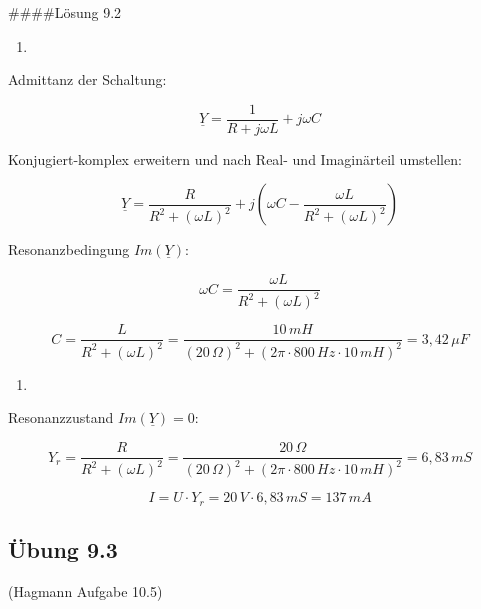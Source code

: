 \documentclass[
  ngerman,
  letterpaper,
]{scrbook}
\providecommand{\tightlist}{%
  \setlength{\itemsep}{0pt}\setlength{\parskip}{0pt}}
\begin{document}
\begin{tcolorbox}[enhanced jigsaw, titlerule=0mm, rightrule=.15mm, toprule=.15mm, colback=white, toptitle=1mm, bottomrule=.15mm, coltitle=black, leftrule=.75mm, arc=.35mm, colbacktitle=quarto-callout-caution-color!10!white, opacityback=0, bottomtitle=1mm, colframe=quarto-callout-caution-color-frame, opacitybacktitle=0.6, breakable, title=\textcolor{quarto-callout-caution-color}{\faFire}\hspace{0.5em}{Vorsicht}, left=2mm]

\#\#\#\#Lösung 9.2

\begin{enumerate}
\def\labelenumi{\alph{enumi})}
\tightlist
\item
\end{enumerate}

Admittanz der Schaltung:

\[\underline{Y} = \frac{1}{R + j\omega L} + j\omega C\]

Konjugiert-komplex erweitern und nach Real- und Imaginärteil umstellen:

\[\underline{Y} = \frac{R}{R^2 + (\omega L)^2} + j\left( \omega C - \frac{\omega L}{R^2 + (\omega L)^2} \right)\]

Resonanzbedingung \(Im(\underline{Y})\):

\[\omega C = \frac{\omega L}{R^2 + (\omega L)^2}\]

\[C = \frac{L}{R^2 + (\omega L)^2} = \frac{10\,mH}{(20\,\Omega)^2 + (2\pi \cdot 800\,Hz \cdot 10\,mH)^2} = 3,42\,\mu F\]

\begin{enumerate}
\def\labelenumi{\alph{enumi})}
\setcounter{enumi}{1}
\tightlist
\item
\end{enumerate}

Resonanzzustand \(Im(\underline{Y}) = 0\):

\[Y_r = \frac{R}{R^2 + (\omega L)^2} = \frac{20\,\Omega}{(20\,\Omega)^2 + (2\pi \cdot 800\,Hz \cdot 10\,mH)^2} = 6,83\,mS\]

\[I = U \cdot Y_r = 20\,V \cdot 6,83\,mS = 137\,mA\]

\end{tcolorbox}

\subsection{Übung 9.3}\label{uxfcbung-9.3}

(Hagmann Aufgabe 10.5)
\end{document}
